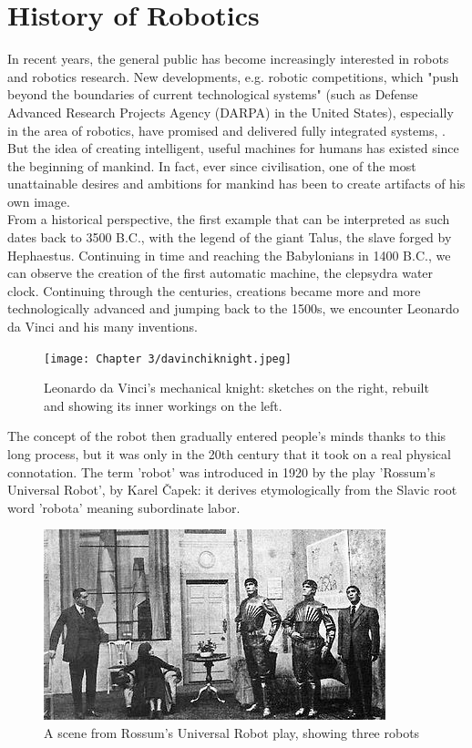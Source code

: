 \section{History of Robotics}
In recent years, the general public has become increasingly interested in robots and robotics research. New developments, e.g. robotic competitions, which "push beyond the boundaries of current technological
systems" (such as Defense Advanced Research Projects Agency (DARPA) in the
United States), especially in the area of robotics, have promised and delivered
fully integrated systems, \citet{robocomp}.\\
But the idea of creating intelligent, useful machines for humans has existed since the beginning of mankind.
In fact, ever since civilisation, one of the most unattainable desires and ambitions for mankind has been to create artifacts of his own image.\\
From a historical perspective, the first example that can be interpreted as such dates back to 3500 B.C., with the legend of the giant Talus, the slave forged by Hephaestus.
Continuing in time and reaching the Babylonians in 1400 B.C., we can observe the creation of the first automatic machine, the clepsydra water clock.
Continuing through the centuries, creations became more and more technologically advanced and jumping back to the 1500s, we encounter Leonardo da Vinci and his many inventions.
\begin{figure}[H]
    \centering
    \texttt{[image: Chapter 3/davinchiknight.jpeg]}
    \caption{Leonardo da Vinci’s mechanical knight: sketches on the right, rebuilt
and showing its inner workings on the left.}
    \label{fig:my_label}
\end{figure}
The concept of the robot then gradually entered people's minds thanks to this long process, but it was only in the 20th century that it took on a real physical connotation.
\newline
The term 'robot' was introduced in 1920 by the play 'Rossum's Universal Robot', by Karel Čapek: it derives etymologically from the Slavic root word 'robota' meaning subordinate labor.
\begin{figure}[H]
    \centering
    \includegraphics{Images/Chapter 3/rossumplay.jpg}
    \caption{A scene from Rossum's Universal Robot play, showing three robots}
    \label{fig:rossum}
\end{figure}
